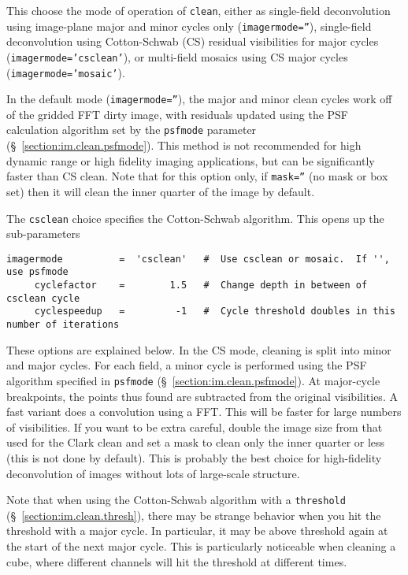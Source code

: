 This choose the mode of operation of {\tt clean}, either as
single-field deconvolution using image-plane major and minor
cycles only ({\tt imagermode=''}), single-field deconvolution
using Cotton-Schwab (CS) residual visibilities for major cycles
({\tt imagermode='csclean'}), or multi-field mosaics using CS
major cycles ({\tt imagermode='mosaic'}).

In the default mode ({\tt imagermode=''}), the major and minor
clean cycles work off of the gridded FFT dirty image, with residuals
updated using the PSF calculation algorithm set by the {\tt psfmode}
parameter (\S~\ref{section:im.clean.psfmode}).  This method is not
recommended for high dynamic range or high fidelity imaging 
applications, but can be significantly faster than CS clean.
Note that for this option only, if {\tt mask=''} (no mask or box
set) then it will clean the inner quarter of the image by
default.

The {\tt csclean} choice specifies the Cotton-Schwab algorithm.  This
opens up the sub-parameters
\small
\begin{verbatim}
imagermode          =  'csclean'   #  Use csclean or mosaic.  If '', use psfmode
     cyclefactor    =        1.5   #  Change depth in between of  csclean cycle
     cyclespeedup   =         -1   #  Cycle threshold doubles in this number of iterations

\end{verbatim}
\normalsize
These options are explained below.
In the CS mode, cleaning is split into minor and major cycles. For each field, a
minor cycle is performed using the PSF algorithm specified in
{\tt psfmode} (\S~\ref{section:im.clean.psfmode}).
At major-cycle breakpoints, the points
thus found are subtracted from the original visibilities. A fast
variant does a convolution using a FFT. This will be faster for large
numbers of visibilities.  If you want to be extra careful, double the image 
size from that used for the Clark clean and set a mask to clean only
the inner quarter or less (this is not done by default).
This is probably the best choice for high-fidelity deconvolution 
of images without lots of large-scale structure.

Note that when using the Cotton-Schwab algorithm with a {\tt threshold}
(\S~\ref{section:im.clean.thresh}), there may be strange
behavior when you hit the threshold with a major cycle.  In
particular, it may be above threshold again at the start of the next
major cycle.  This is particularly noticeable when cleaning a cube,
where different channels will hit the threshold at different times.

